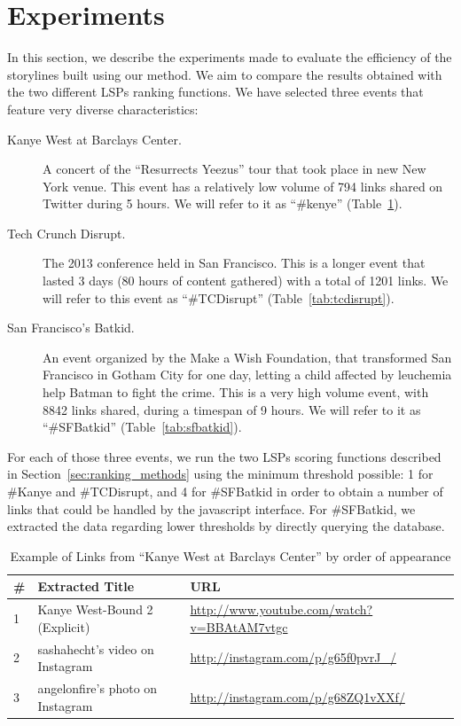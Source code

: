 \documentclass{sig-alternate}
\begin{document}
\section{Experiments}
\label{sec:experiments}
In this section, we describe the experiments made to evaluate the efficiency of the storylines built using our method. We aim to compare the results obtained with the two different LSPs ranking functions. We have selected three events that feature very diverse characteristics:
\begin{description}
 \item[Kanye West at Barclays Center.] A concert of the ``Resurrects Yeezus'' tour that took place in new New York venue. This event has a relatively low volume of 794 links shared on Twitter during 5 hours. We will refer to it as ``\#kenye'' (Table~\ref{tab:kanye}).
 \item[Tech Crunch Disrupt.] The 2013 conference held in San Francisco. This is a longer event that lasted 3 days (80 hours of content gathered) with a total of 1201 links. We will refer to this event as ``\#TCDisrupt'' (Table~\ref{tab:tcdisrupt}).
 \item[San Francisco's Batkid.] An event organized by the Make a Wish Foundation, that transformed San Francisco in Gotham City for one day, letting a child affected by leuchemia help Batman to fight the crime. This is a very high volume event, with 8842 links shared, during a timespan of 9 hours. We will refer to it as ``\#SFBatkid'' (Table~\ref{tab:sfbatkid}).
\end{description}

For each of those three events, we run the two LSPs scoring functions described in Section~\ref{sec:ranking_methods} using the minimum threshold possible: 1 for \#Kanye and \#TCDisrupt, and 4 for \#SFBatkid in order to obtain a number of links that could be handled by the javascript interface. For \#SFBatkid, we extracted the data regarding lower thresholds by directly querying the database.

\begin{table}[htbp]
 \begin{tabular}{| p{0.2cm} | p{3.5cm} | p{3.8cm} |}
  \hline
  \textbf{\#} & \textbf{Extracted Title} & \textbf{URL} \\
  \hline
  1 & Kanye West-Bound 2 (Explicit) & \url{http://www.youtube.com/watch?v=BBAtAM7vtgc} \\
  \hline
  2 & sashahecht's video on Instagram & \url{http://instagram.com/p/g65f0pvrJ_/} \\
  \hline
  3 & angelonfire's photo on Instagram & \url{http://instagram.com/p/g68ZQ1vXXf/} \\
  \hline
 \end{tabular}
 \caption{Example of Links from ``Kanye West at Barclays Center'' by order of appearance}
 \label{tab:kanye}
\end{table}
\end{document}
